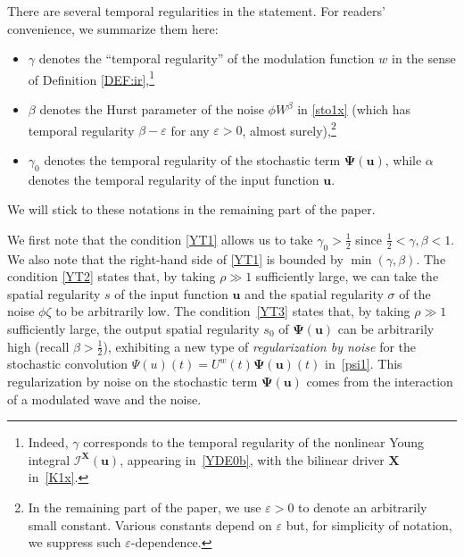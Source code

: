 \documentclass[letterpaper, 11pt,  reqno]{amsart}
\newcommand{\1}{\hspace{0.5mm}\textup{I}\hspace{0.5mm}}
\newcommand{\I}{\mathcal{I}}
\newcommand{\noi}{\noindent}
\newcommand{\al}{\alpha}
\newcommand{\be}{\beta}
\newcommand{\eps}{\varepsilon}
\newcommand{\g}{\gamma}
\newcommand{\s}{\sigma}
\newcommand{\uw}{U^w}
\newcommand{\uu}{\mathbf{u}}
\newcommand{\z}{\zeta}
\newcommand{\PPsi}{\pmb{\Psi}}
\newcommand{\XX}{\mathbf{X}}
\numberwithin{equation}{section}
\numberwithin{theorem}{section}
\begin{document}
There are several temporal regularities in the statement.
For readers' convenience, we summarize them here:
\begin{itemize}
\item 
$\g$ denotes the ``temporal regularity'' of the modulation function $w$
in the sense of Definition \ref{DEF:ir},\footnote{Indeed, 
$\g$ 
corresponds to the temporal regularity of the nonlinear Young integral 
$\I^\XX(\uu)$,  appearing in~\eqref{YDE0b},  
with the bilinear driver $\XX$ in~\eqref{K1x}.}

\smallskip
\item 
$\be$ denotes the Hurst parameter of the noise $\phi W^\be$ in \eqref{sto1x}
(which has temporal regularity $\be - \eps$ for any $\eps > 0$, almost surely),\footnote{In the remaining part
of the paper, we use $\eps > 0$ to denote an arbitrarily small constant.
Various constants depend on $\eps$ but,
for simplicity of notation,  we suppress such $\eps$-dependence.}


\smallskip
\item 
$\g_0$ denotes the temporal regularity of the stochastic term $\PPsi (\uu)$, 
while 
$\al$ denotes the temporal regularity of the input function $\uu$.

\end{itemize}


\smallskip


\noi
We will stick to these notations in the remaining part of the paper.


We first note that the condition \eqref{YT1}
allows us to take $\g_0 > \frac 12$ since 
$\frac 12 < \g, \be < 1$.
We also note that the right-hand side of \eqref{YT1}
is bounded by $\min(\g, \be)$.
The condition \eqref{YT2}
states that, by taking $\rho \gg 1$ sufficiently large, 
we can take 
 the  spatial regularity $s$ of the input function $\uu$
and the spatial regularity $\s$ of the noise $\phi \z$
to be arbitrarily low.
The condition~\eqref{YT3}
states that, by taking $\rho \gg 1$ sufficiently large,  
 the output spatial regularity $s_0$ of $\PPsi(\uu)$
 can be  arbitrarily high (recall $\be>  \frac 12$), 
 exhibiting a new type of {\it regularization by noise}
 for the stochastic convolution $\Psi(u)(t) = \uw(t)\PPsi(\uu)(t)$
 in~\eqref{psi1}.
This regularization by noise
on the stochastic term $\PPsi(\uu)$
comes from  the 
 interaction of a  modulated wave and the noise.
\end{document}
